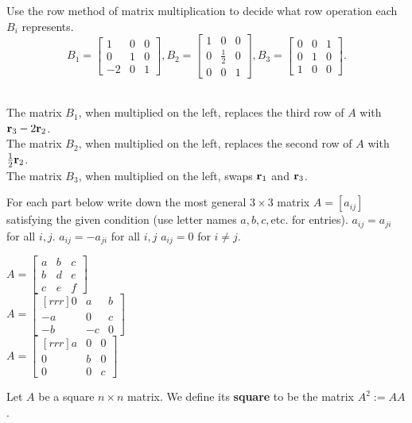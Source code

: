 Use the row method of matrix multiplication to decide what row operation each $B_i$ represents. 
\[
B_1=\begin{bmatrix}
1&0&0\\
0&1&0\\
-2&0&1
\end{bmatrix},
B_2=\begin{bmatrix}
1&0&0\\
0&\frac{1}{2}&0\\
0&0&1
\end{bmatrix},
B_3=\begin{bmatrix}
0&0&1\\
0&1&0\\
1&0&0
\end{bmatrix}.
\] 
\ \\
\begin{solution}
\noindent The matrix $B_1$, when multiplied on the left, replaces the third row of $A$ with ${\mathbf r}_3-2{\mathbf r}_2$. 
 \\
The matrix $B_2$, when multiplied on the left, replaces the second row  of $A$ with $\frac{1}{2}{\mathbf r}_2$. 
\\
The matrix $B_3$, when multiplied on the left, swaps ${\mathbf r}_1$ and ${\mathbf r}_3$. 
\end{solution}
\ii For each part below write down the most general $3\times 3$ matrix $A=[a_{ij}]$ satisfying the given condition (use letter names $a,b,c,$etc. for entries).   
\bb
\ii  $a_{ij}=a_{ji}$ for all $i,j$. 
\ii $a_{ij}=-a_{ji}$ for all $i,j$ 
\ii $a_{ij}=0$ for $i\ne j$. 
\ee
\ \\
\begin{solution}
\noindent
$A=\begin{bmatrix}
a&b&c\\
b&d&e\\
c&e&f
\end{bmatrix}$
\vspace{.1in}
\\
$A=\begin{bmatrix}[rrr]
0&a&b\\
-a&0&c\\
-b&-c&0
\end{bmatrix}$
\vspace{.1in}
\\
$A=\begin{bmatrix}[rrr]
a&0&0\\
0&b&0\\
0&0&c
\end{bmatrix}
$
\end{solution}
\ii Let $A$ be a square $n\times n$ matrix. We define its {\bf square} to be the matrix $A^2:=AA$. 

